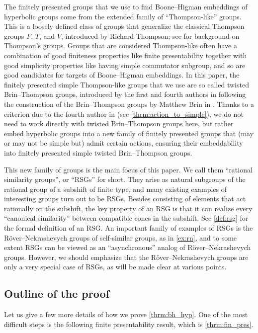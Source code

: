 \documentclass[11pt,letterpaper]{amsart}
\theoremstyle{definition}
\begin{document}
\medskip

The finitely presented groups that we use to find Boone--Higman embeddings of hyperbolic groups come from the extended family of ``Thompson-like'' groups. This is a loosely defined class of groups that generalize the classical Thompson groups $F$, $T$, and $V$, introduced by Richard Thompson; see \cite{CFP} for background on Thompson's groups. Groups that are considered Thompson-like often have a combination of good finiteness properties like finite presentability together with good simplicity properties like having simple commutator subgroup, and so are good candidates for targets of Boone--Higman embeddings. In this paper, the finitely presented simple Thompson-like groups that we use are so called twisted Brin--Thompson groups, introduced by the first and fourth authors in \cite{BelkZaremskyTwisted} following the construction of the Brin--Thompson groups by Matthew Brin in \cite{brin04}. Thanks to a criterion due to the fourth author in \cite{zaremskyTaste} (see \cref{thrm:action_to_simple}), we do not need to work directly with twisted Brin--Thompson groups here, but rather embed hyperbolic groups into a new family of finitely presented groups that (may or may not be simple but) admit certain actions, ensuring their embeddability into finitely presented simple twisted Brin--Thompson groups.

This new family of groups is the main focus of this paper. We call them ``rational similarity groups'', or ``RSGs'' for short. They arise as natural subgroups of the rational group of a subshift of finite type, and many existing examples of interesting groups turn out to be RSGs. Besides consisting of elements that act rationally on the subshift, the key property of an RSG is that it can realize every ``canonical similarity'' between compatible cones in the subshift. See \cref{def:rsg} for the formal definition of an RSG. An important family of examples of RSGs is the R\"over--Nekrashevych groups of self-similar groups, as in \cref{ex:rn}, and to some extent RSGs can be viewed as an ``asynchronous'' analog of R\"over--Nekrashevych groups. However, we should emphasize that the R\"over--Nekrashevych groups are only a very special case of RSGs, as will be made clear at various points.


\subsection{Outline of the proof}\label{ssec:outline}

Let us give a few more details of how we prove \cref{thrm:bh_hyp}. One of the most difficult steps is the following finite presentability result, which is \cref{thrm:fin_pres}.
\end{document}
